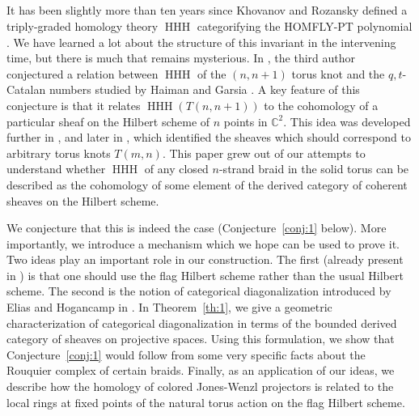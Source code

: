 \documentclass[12pt]{amsart}
\numberwithin{equation}{section}
\theoremstyle{definition}
\theoremstyle{remark}
\DeclareMathOperator{\HHH}{HHH}
\newcommand{\CC}{\mathbb{C}}
\renewcommand{\1}{\mathbf{1}}
\begin{document}
\subsection{} It has been slightly more than ten years since Khovanov and Rozansky defined a triply-graded homology theory \(\HHH\) categorifying the HOMFLY-PT polynomial \cite{KhR2}. We have learned a lot about the structure of this invariant in the intervening time, but there is much that remains mysterious. In \cite{GCatalan}, the third author conjectured  a relation between \(\HHH\) of the \((n,n+1)\) torus knot and the $q,t$-Catalan numbers studied by Haiman and Garsia \cite{GarsiaHaimanCatalan, Hai}. A key feature of this conjecture is that it relates \(\HHH(T(n,n+1))\) to the cohomology of a particular sheaf on the Hilbert scheme of \(n\) points in \(\CC^2\). This idea was developed further in \cite{GORS}, and later in \cite{GN}, which identified the sheaves which should correspond to arbitrary torus knots \(T(m,n)\). This paper grew out of our attempts to understand whether  \(\HHH\) of any closed \(n\)-strand braid in the solid torus can be described as the cohomology of some element of the derived category of coherent sheaves on the Hilbert scheme. 

We conjecture that this is indeed the case (Conjecture~\ref{conj:1} below). More importantly, we introduce a   mechanism which we hope can be used to prove it. Two ideas play an important role in our construction. The first (already present in \cite{GN}) is that one should use the flag Hilbert scheme rather than the usual Hilbert scheme. The second is the notion of categorical diagonalization introduced by Elias and Hogancamp in \cite{EH}.  In Theorem~\ref{th:1}, we give a geometric characterization of categorical diagonalization in terms of the bounded derived category of sheaves on projective spaces.
Using this formulation, we show that Conjecture~\ref{conj:1} would follow from some very specific facts about the Rouquier complex of certain braids. 
Finally, as an application of our ideas, we describe how the homology of colored Jones-Wenzl projectors is related to the local rings at fixed points of the natural torus action on the flag Hilbert scheme. 

\subsection{}
\label{sub:intro hecke}
\end{document}
